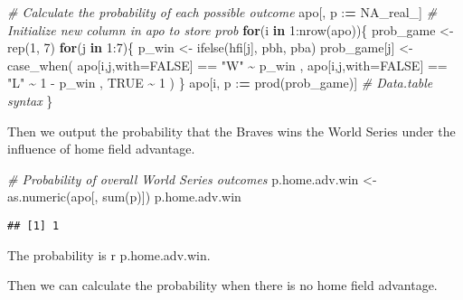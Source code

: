 \documentclass[
]{article}
\newenvironment{Shaded}{\begin{snugshade}}{\end{snugshade}}
\newcommand{\AttributeTok}[1]{\textcolor[rgb]{0.77,0.63,0.00}{#1}}
\newcommand{\CommentTok}[1]{\textcolor[rgb]{0.56,0.35,0.01}{\textit{#1}}}
\newcommand{\ConstantTok}[1]{\textcolor[rgb]{0.00,0.00,0.00}{#1}}
\newcommand{\ControlFlowTok}[1]{\textcolor[rgb]{0.13,0.29,0.53}{\textbf{#1}}}
\newcommand{\DecValTok}[1]{\textcolor[rgb]{0.00,0.00,0.81}{#1}}
\newcommand{\ErrorTok}[1]{\textcolor[rgb]{0.64,0.00,0.00}{\textbf{#1}}}
\newcommand{\FunctionTok}[1]{\textcolor[rgb]{0.00,0.00,0.00}{#1}}
\newcommand{\NormalTok}[1]{#1}
\newcommand{\OtherTok}[1]{\textcolor[rgb]{0.56,0.35,0.01}{#1}}
\newcommand{\SpecialCharTok}[1]{\textcolor[rgb]{0.00,0.00,0.00}{#1}}
\newcommand{\StringTok}[1]{\textcolor[rgb]{0.31,0.60,0.02}{#1}}
\begin{document}
\begin{Shaded}
\begin{Highlighting}[]
\CommentTok{\# Calculate the probability of each possible outcome}
\NormalTok{apo[, p }\SpecialCharTok{:}\ErrorTok{=} \ConstantTok{NA\_real\_}\NormalTok{] }\CommentTok{\# Initialize new column in apo to store prob}
\ControlFlowTok{for}\NormalTok{(i }\ControlFlowTok{in} \DecValTok{1}\SpecialCharTok{:}\FunctionTok{nrow}\NormalTok{(apo))\{}
\NormalTok{  prob\_game }\OtherTok{\textless{}{-}} \FunctionTok{rep}\NormalTok{(}\DecValTok{1}\NormalTok{, }\DecValTok{7}\NormalTok{)}
  \ControlFlowTok{for}\NormalTok{(j }\ControlFlowTok{in} \DecValTok{1}\SpecialCharTok{:}\DecValTok{7}\NormalTok{)\{}
\NormalTok{    p\_win }\OtherTok{\textless{}{-}} \FunctionTok{ifelse}\NormalTok{(hfi[j], pbh, pba)}
\NormalTok{    prob\_game[j] }\OtherTok{\textless{}{-}} \FunctionTok{case\_when}\NormalTok{(}
\NormalTok{        apo[i,j,}\AttributeTok{with=}\ConstantTok{FALSE}\NormalTok{] }\SpecialCharTok{==} \StringTok{"W"} \SpecialCharTok{\textasciitilde{}}\NormalTok{ p\_win}
\NormalTok{      , apo[i,j,}\AttributeTok{with=}\ConstantTok{FALSE}\NormalTok{] }\SpecialCharTok{==} \StringTok{"L"} \SpecialCharTok{\textasciitilde{}} \DecValTok{1} \SpecialCharTok{{-}}\NormalTok{ p\_win}
\NormalTok{      , }\ConstantTok{TRUE} \SpecialCharTok{\textasciitilde{}} \DecValTok{1}
\NormalTok{    )}
\NormalTok{  \}}
\NormalTok{  apo[i, p }\SpecialCharTok{:}\ErrorTok{=} \FunctionTok{prod}\NormalTok{(prob\_game)] }\CommentTok{\# Data.table syntax}
\NormalTok{\}}
\end{Highlighting}
\end{Shaded}

Then we output the probability that the Braves wins the World Series
under the influence of home field advantage.

\begin{Shaded}
\begin{Highlighting}[]
\CommentTok{\# Probability of overall World Series outcomes}
\NormalTok{p.home.adv.win }\OtherTok{\textless{}{-}} \FunctionTok{as.numeric}\NormalTok{(apo[, }\FunctionTok{sum}\NormalTok{(p)])}
\NormalTok{p.home.adv.win}
\end{Highlighting}
\end{Shaded}

\begin{verbatim}
## [1] 1
\end{verbatim}

The probability is r p.home.adv.win.

Then we can calculate the probability when there is no home field
advantage.
\end{document}
